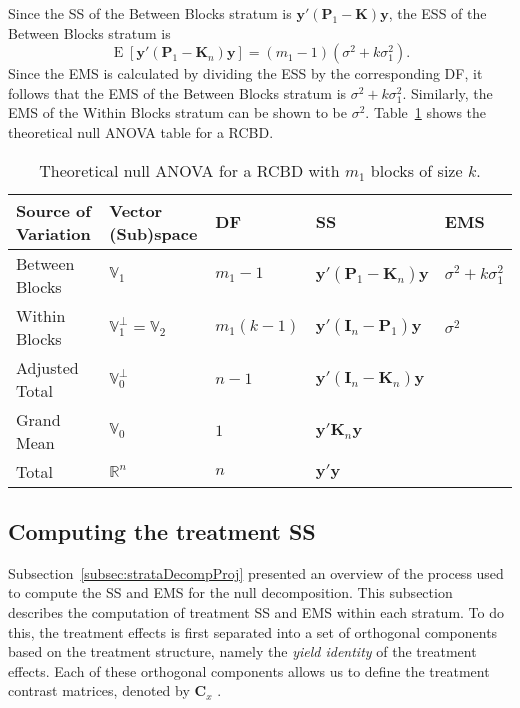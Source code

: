 \documentclass[article]{jss}
\newcommand{\mP}{\mathbf{P}}
\newcommand{\I}{\mathbf{I}}
\newcommand{\K}{\mathbf{K}}
\newcommand{\C}{\mathbf{C}}
\begin{document}
Since the SS of the Between Blocks stratum is $\bm{y}'(\mP_{1}-\K)\bm{y}$, the ESS of the Between Blocks stratum is
\begin{equation} \label{eq:computRBD}
\operatorname{E}[\bm{y}'(\mP_{1}-\K_n)\bm{y}] =  (m_1 - 1)(\sigma^2 +k\sigma^2_1).
\end{equation}
Since the EMS is calculated by dividing the ESS by the corresponding DF, it follows that the EMS of the Between Blocks stratum is $\sigma^2 +k\sigma^2_1$. Similarly, the EMS of the Within Blocks stratum can be shown to be $\sigma^2$. Table~\ref{tab:infoDecomp} shows the theoretical null ANOVA table for a RCBD.

\begin{table}[ht]
\centering
\caption{Theoretical null ANOVA	for a RCBD with $m_1$ blocks of size $k$.}
\begin{tabular}[t]{lllll}
\toprule
 \multicolumn{1}{l}{\bf Source of Variation}& \multicolumn{1}{l}{\bf Vector (Sub)space} & \multicolumn{1}{l}{\bf DF} & \multicolumn{1}{l}{\bf SS} & \multicolumn{1}{l}{\bf EMS}\\
\midrule
Between Blocks 	& $\mathbb{V}_1$ &$m_1-1$ & $\bm{y}'(\mP_{1}-\K_n)\bm{y}$	& $\sigma^2 + k\sigma_{1}^2$\\
Within Blocks 	& $\mathbb{V}^{\perp}_1 = \mathbb{V}_2$	&$m_1(k - 1)$ & $\bm{y}'(\I_n - \mP_{1})\bm{y}$  & $\sigma^2$\\
\hline
Adjusted Total	& $\mathbb{V}^{\perp}_0$	& $n - 1$ & $\bm{y}'(\I_n - \K_n)\bm{y}$ \\
\hline
Grand Mean	& $\mathbb{V}_0$	& $1$ & $\bm{y}'\K_n\bm{y}$ \\
\midrule
Total 	& $\mathbb{R}^n$	& $n$ & $\bm{y}'\bm{y}$ \\
\bottomrule
\end{tabular}
\label{tab:infoDecomp}
\end{table}

\subsection{Computing the treatment SS}
\label{subsec:estTrt}
Subsection~\ref{subsec:strataDecompProj} presented an overview of the process used to compute the SS and EMS for the null decomposition. This subsection describes the computation of treatment SS and EMS within each stratum. To do this, the treatment effects is first separated into a set of orthogonal components based on the treatment structure, namely the \emph{yield identity} of the treatment effects.  Each of these orthogonal components allows us to define the treatment contrast matrices, denoted by $\C_x$ \citep{John1987}. 
\end{document}
